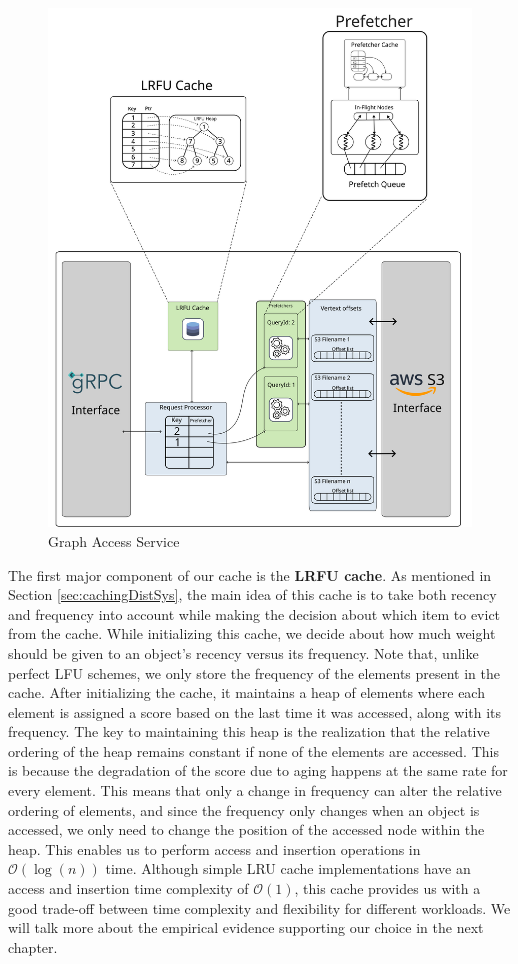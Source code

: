 \begin{figure}[ht]
    \centering
    \includegraphics[width=\textwidth]{figures/graphAccessServiceFinal.png}
    \caption{Graph Access Service}
    \label{fig:graphAccessArch}
\end{figure}

\medskip
The first major component of our cache is the \textbf{LRFU
cache}\cite{lee2001lrfu}. As mentioned in Section \ref{sec:cachingDistSys}, the
main idea of this cache is to take both recency and frequency into account while
making the decision about which item to evict from the cache. While initializing
this cache, we decide about how much weight should be given to an
object's recency versus its frequency. Note that, unlike perfect LFU schemes, we
only store the frequency of the elements present in the cache. After
initializing the cache, it maintains a heap of elements where each element is
assigned a score based on the last time it was accessed, along with its
frequency. The key to maintaining this heap is the realization that the relative
ordering of the heap remains constant if none of the elements are accessed. This
is because the degradation of the score due to aging happens at the same
rate for every element. This means that only a change in frequency can alter
the relative ordering of elements, and since the frequency only changes when an
object is accessed, we only need to change the position of the accessed node
within the heap. This enables us to perform access and insertion operations in
$\mathcal{O}(\log(n))$ time. Although simple LRU cache implementations have an
access and insertion time complexity of $\mathcal{O}(1)$,  this cache provides 
us with a good trade-off between time complexity and flexibility for 
different workloads. We will talk more about the empirical evidence supporting
our choice in the next chapter.

